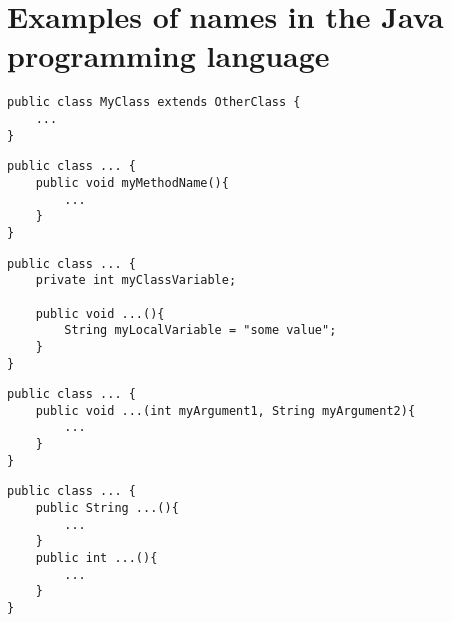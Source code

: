 \section{Examples of names in the Java programming language}
\label{appendix:java-nameabe-examples}

\begin{lstlisting}[caption=Class names]
public class MyClass extends OtherClass {
	...
}
\end{lstlisting}

\begin{lstlisting}[caption=Methods]
public class ... {
	public void myMethodName(){
		...
	}
}
\end{lstlisting}

\begin{lstlisting}[caption=Variables]
public class ... {
	private int myClassVariable;
	
	public void ...(){
		String myLocalVariable = "some value";
	}
}
\end{lstlisting}

\begin{lstlisting}[caption=Method arguments]
public class ... {
	public void ...(int myArgument1, String myArgument2){
		...
	}
}
\end{lstlisting}

\begin{lstlisting}[caption=Return types]
public class ... {
	public String ...(){
		...
	}
	public int ...(){
		...
	}
}
\end{lstlisting}